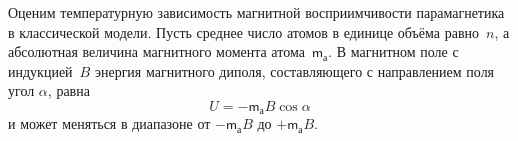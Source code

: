 %



Оценим температурную зависимость магнитной восприимчивости парамагнетика
в классической модели.
Пусть среднее число атомов в единице объёма равно~$n$, а абсолютная величина
магнитного момента атома~$\mathsf{m}_{\text{а}}$.
В магнитном поле с индукцией~$B$ энергия магнитного диполя,
составляющего с направлением поля угол $\alpha$, равна
\begin{equation*}
	U = - \mathsf{m}_{\text{а}}B \cos \alpha
\end{equation*}
и может меняться в диапазоне от $-\mathsf{m}_{а}B$ до $+\mathsf{m}_{а}B$.

